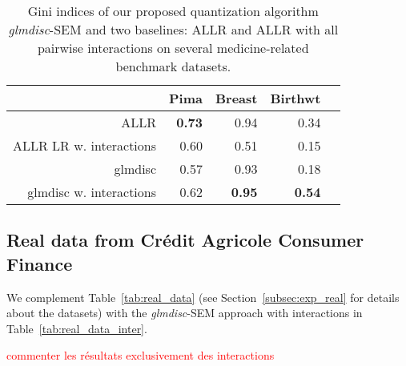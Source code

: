 \begin{table}[t]
\begin{center}
\caption{Gini indices of our proposed quantization algorithm \textit{glmdisc}-SEM and two baselines: ALLR and ALLR with all pairwise interactions on several medicine-related benchmark datasets.}
\label{tab:banchmark_medicine}
\begin{adjustbox}{max width=0.99\textwidth}
\begin{tabular}{rrrrr}
 & Pima & Breast & Birthwt \\ 
  \hline
ALLR & {\textbf{0.73}} & 0.94 & 0.34 \\ 
ALLR LR w. interactions & 0.60 & 0.51 & 0.15 \\ 
glmdisc & 0.57 & 0.93 & 0.18 \\ 
glmdisc w. interactions & 0.62 & {\textbf{0.95}} & {\textbf{0.54}} \\ 
\end{tabular}
\end{adjustbox}
\end{center}
\end{table}


\subsection{Real data from Crédit Agricole Consumer Finance}

We complement Table~\ref{tab:real_data} (see Section~\ref{subsec:exp_real} for details about the datasets) with the \textit{glmdisc}-SEM approach with interactions in Table~\ref{tab:real_data_inter}.

\textcolor{red}{commenter les résultats exclusivement des interactions}

